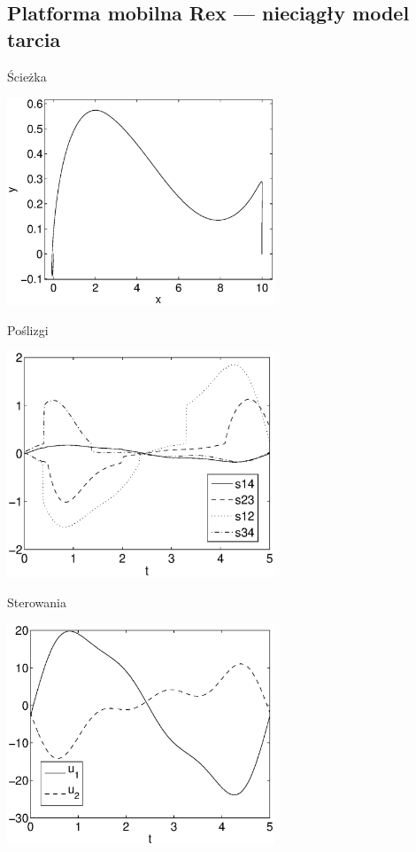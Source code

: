 \documentclass{beamer}
\begin{document}
\subsection{Platforma mobilna Rex --- nieciągły model tarcia}
\begin{frame}{Ścieżka}
\begin{center}
\includegraphics[width=0.6\textwidth]{img/discont_ok_path.eps}
\end{center}
\end{frame}
\begin{frame}{Poślizgi}
\begin{center}
\includegraphics[width=0.6\textwidth]{img/discont_ok_slips.eps}
\end{center}
\end{frame}
\begin{frame}{Sterowania}
\begin{center}
\includegraphics[width=0.6\textwidth]{img/discont_ok_u.eps}
\end{center}
\end{frame}
\end{document}

